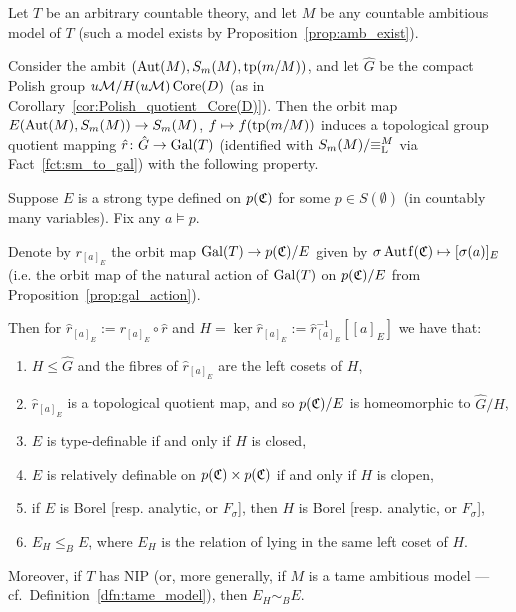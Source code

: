 	\begin{thm}
		\label{thm:main_galois}
		Let $T$ be an arbitrary countable theory, and let $M$ be any countable ambitious model of $T$ (such a model exists by Proposition~\ref{prop:amb_exist}).
		
		Consider the ambit $(\operatorname{{Aut}}(M),S_m(M),\operatorname{{tp}}(m/M))$, and let $\hat G$ be the compact Polish group $u{\mathcal M}/H(u{\mathcal M})\operatorname{{Core}}(D)$ (as in Corollary~\ref{cor:Polish_quotient_Core(D)}). Then the orbit map $E(\operatorname{{Aut}}(M),S_m(M))\to S_m(M)$, $f\mapsto f(\operatorname{{tp}}(m/M))$ induces a topological group quotient mapping $\hat r\colon \hat G\to \operatorname{{Gal}}(T)$ (identified with $S_m(M)/{\equiv_{\mathrm{L}}^M}$ via Fact~\ref{fct:sm_to_gal}) with the following property.
		
		Suppose $E$ is a strong type defined on $p({\mathfrak C})$ for some $p\in S(\emptyset)$ (in countably many variables). Fix any $a\models p$.
		
		Denote by $r_{[a]_E}$ the orbit map $\operatorname{{Gal}}(T)\to p({\mathfrak C})/E$ given by $\sigma \Autf(\fC)\mapsto[\sigma(a)]_E$ (i.e. the orbit map of the natural action of $\operatorname{{Gal}}(T)$ on $p({\mathfrak C})/E$ from Proposition~\ref{prop:gal_action}).
		
		Then for $\hat r_{[a]_E}:=r_{[a]_E}\circ \hat r$ and $H=\ker \hat r_{[a]_E}:=\hat r_{[a]_E}^{-1}[[a]_E]$ we have that:
		\begin{enumerate}
			\item
			$H\leq \hat G$ and the fibres of $\hat r_{[a]_E}$ are the left cosets of $H$,
			\item
			$\hat r_{[a]_E}$ is a topological quotient map, and so $p({\mathfrak C})/E$ is homeomorphic to $\hat G/H$,
			\item
			$E$ is type-definable if and only if $H$ is closed,
			\item
			$E$ is relatively definable on $p({\mathfrak C}) \times p({\mathfrak C})$ if and only if $H$ is clopen,
			\item
			if $E$ is Borel [resp. analytic, or $F_\sigma$], then $H$ is Borel [resp. analytic, or $F_\sigma$],
			\item
			$E_H\leq_B E$, where $E_H$ is the relation of lying in the same left coset of $H$.
		\end{enumerate}
		
		Moreover, if $T$ has NIP (or, more generally, if $M$ is a tame ambitious model --- cf.\ Definition~\ref{dfn:tame_model}), then $E_H\sim_B E$.
	\end{thm}
